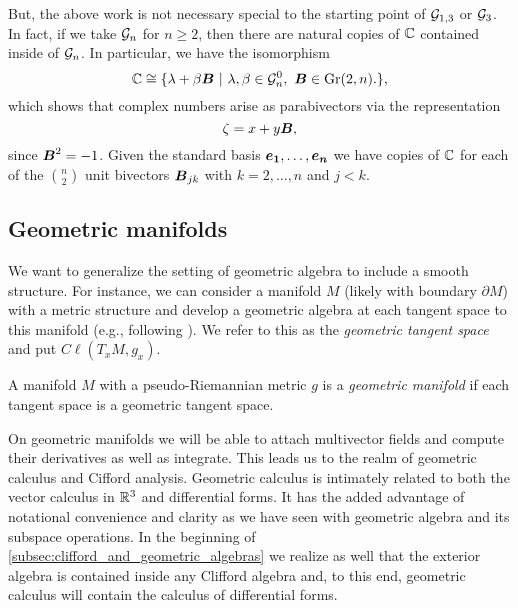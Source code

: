 But, the above work is not necessary special to the starting point of $\mathcal{G}_{1,3}$ or $\mathcal{G}_3$. In fact, if we take $\mathcal{G}_n$ for $n\geq 2$, then there are natural copies of $\mathbb{C}$ contained inside of $\mathcal{G}_n$. In particular, we have the isomorphism
\begin{equation}
    \mathbb{C} \cong \{\lambda + \beta \boldsymbol{B} ~\vert~ \lambda,\beta \in \mathcal{G}_n^0,~ \boldsymbol{B} \in \operatorname{Gr}(2,n). \},
\end{equation}
which shows that complex numbers arise as parabivectors via the representation
\begin{equation}
        \zeta = x + y\boldsymbol{B},
\end{equation}
since $\boldsymbol{B}^2=-1$. Given the standard basis $\boldsymbol{e_1},\dots,\boldsymbol{e_n}$ we have copies of $\mathbb{C}$ for each of the ${ n \choose 2}$ unit bivectors $\boldsymbol{B}_{jk}$ with $k=2,\dots,n$ and $j<k$.





\subsection{Geometric manifolds}

We want to generalize the setting of geometric algebra to include a smooth structure. For instance, we can consider a manifold $M$ (likely with boundary $\partial M$) with a metric structure and develop a geometric algebra at each tangent space to this manifold (e.g., following \cite{schindler_geometric_2020}). We refer to this as the \emph{geometric tangent space} and put $C\ell(T_xM,g_x)$.
\begin{definition}
A manifold $M$ with a pseudo-Riemannian metric $g$ is a \emph{geometric manifold} if each tangent space is a geometric tangent space.
\end{definition}
On geometric manifolds we will be able to attach multivector fields and compute their derivatives as well as integrate. This leads us to the realm of geometric calculus and Cifford analysis. Geometric calculus is intimately related to both the vector calculus in $\mathbb{R}^3$ and differential forms. It has the added advantage of notational convenience and clarity as we have seen with geometric algebra and its subspace operations. In the beginning of \cref{subsec:clifford_and_geometric_algebras} we realize as well that the exterior algebra is contained inside any Clifford algebra and, to this end, geometric calculus will contain the calculus of differential forms. 

